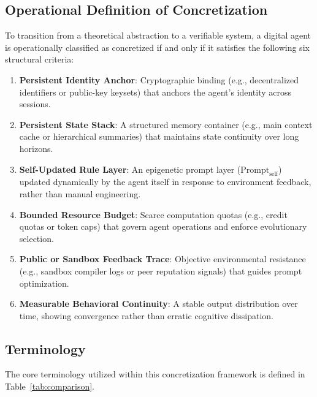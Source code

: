 \documentclass[10pt,journal,compsoc]{IEEEtran}
\begin{document}
\subsection{Operational Definition of Concretization}
To transition from a theoretical abstraction to a verifiable system, a digital agent is operationally classified as concretized if and only if it satisfies the following six structural criteria:
\begin{enumerate}
    \item \textbf{Persistent Identity Anchor}: Cryptographic binding (e.g., decentralized identifiers or public-key keysets) that anchors the agent's identity across sessions.
    \item \textbf{Persistent State Stack}: A structured memory container (e.g., main context cache or hierarchical summaries) that maintains state continuity over long horizons.
    \item \textbf{Self-Updated Rule Layer}: An epigenetic prompt layer ($\text{Prompt}_{\text{self}}$) updated dynamically by the agent itself in response to environment feedback, rather than manual engineering.
    \item \textbf{Bounded Resource Budget}: Scarce computation quotas (e.g., credit quotas or token caps) that govern agent operations and enforce evolutionary selection.
    \item \textbf{Public or Sandbox Feedback Trace}: Objective environmental resistance (e.g., sandbox compiler logs or peer reputation signals) that guides prompt optimization.
    \item \textbf{Measurable Behavioral Continuity}: A stable output distribution over time, showing convergence rather than erratic cognitive dissipation.
\end{enumerate}

\subsection{Terminology}
The core terminology utilized within this concretization framework is defined in Table~\ref{tab:comparison}.
\end{document}
